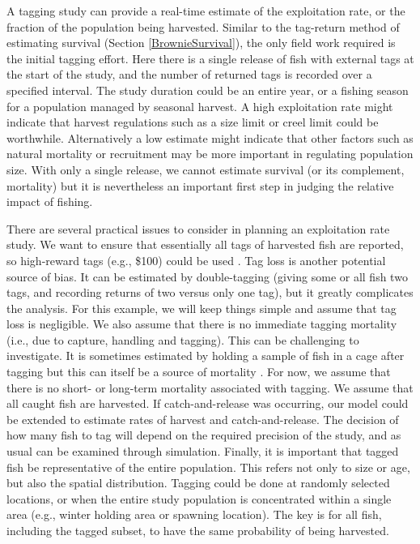 \documentclass[
]{krantz}
\begin{document}
A tagging study can provide a real-time estimate of the exploitation rate, or the fraction of the population being harvested. Similar to the tag-return method of estimating survival (Section \ref{BrownieSurvival}), the only field work required is the initial tagging effort. Here there is a single release of fish with external tags at the start of the study, and the number of returned tags is recorded over a specified interval. The study duration could be an entire year, or a fishing season for a population managed by seasonal harvest. A high exploitation rate might indicate that harvest regulations such as a size limit or creel limit could be worthwhile. Alternatively a low estimate might indicate that other factors such as natural mortality or recruitment may be more important in regulating population size. With only a single release, we cannot estimate survival (or its complement, mortality) but it is nevertheless an important first step in judging the relative impact of fishing.

There are several practical issues to consider in planning an exploitation rate study. We want to ensure that essentially all tags of harvested fish are reported, so high-reward tags (e.g., \$100) could be used \citep{pollock.etal_2001}. Tag loss is another potential source of bias. It can be estimated by double-tagging (giving some or all fish two tags, and recording returns of two versus only one tag), but it greatly complicates the analysis. For this example, we will keep things simple and assume that tag loss is negligible. We also assume that there is no immediate tagging mortality (i.e., due to capture, handling and tagging). This can be challenging to investigate. It is sometimes estimated by holding a sample of fish in a cage after tagging but this can itself be a source of mortality \citep{pollock.pine2007}. For now, we assume that there is no short- or long-term mortality associated with tagging. We assume that all caught fish are harvested. If catch-and-release was occurring, our model could be extended to estimate rates of harvest and catch-and-release. The decision of how many fish to tag will depend on the required precision of the study, and as usual can be examined through simulation. Finally, it is important that tagged fish be representative of the entire population. This refers not only to size or age, but also the spatial distribution. Tagging could be done at randomly selected locations, or when the entire study population is concentrated within a single area (e.g., winter holding area or spawning location). The key is for all fish, including the tagged subset, to have the same probability of being harvested.
\end{document}
